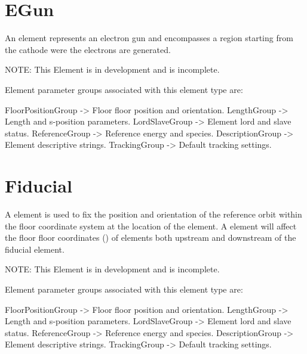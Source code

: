 \section{EGun}
\label{s:egun}

An  element represents an electron gun and encompasses a region starting from the cathode
were the electrons are generated.  

NOTE: This Element is in development and is incomplete.

Element parameter groups associated with this element type are:
\TOPrule
\begin{example}
  FloorPositionGroup -> Floor floor position and orientation.  
  LengthGroup        -> Length and s-position parameters.  
  LordSlaveGroup     -> Element lord and slave status.  
  ReferenceGroup     -> Reference energy and species.  
  DescriptionGroup   -> Element descriptive strings.  
  TrackingGroup      -> Default tracking settings.  
\end{example}
\BOTTOMrule

\section{Fiducial}
\label{s:fiducial}

A  element is used to fix the position and orientation of the reference orbit within
the floor coordinate system at the location of the  element. A  element
will affect the floor floor coordinates () of elements both upstream and downstream
of the fiducial element.

NOTE: This Element is in development and is incomplete.

Element parameter groups associated with this element type are:
\TOPrule
\begin{example}
  FloorPositionGroup -> Floor floor position and orientation.  
  LengthGroup        -> Length and s-position parameters.  
  LordSlaveGroup     -> Element lord and slave status.  
  ReferenceGroup     -> Reference energy and species.  
  DescriptionGroup   -> Element descriptive strings.  
  TrackingGroup      -> Default tracking settings.  
\end{example}
\BOTTOMrule


